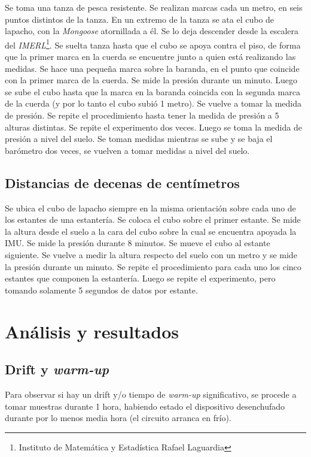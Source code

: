 \documentclass[main]{subfiles}
\begin{document}
Se toma una tanza de pesca resistente. Se realizan marcas cada un metro, en seis puntos distintos de la tanza. En un extremo de la tanza se ata el cubo de lapacho, con la \emph{Mongoose} atornillada a él. Se lo deja descender desde la escalera del \emph{IMERL}\footnote{Instituto de Matemática y Estadística Rafael Laguardia}. Se suelta tanza hasta que el cubo se apoya contra el piso, de forma que la primer marca en la cuerda se encuentre junto a quien está realizando las medidas. Se hace una pequeña marca sobre la baranda, en el punto que coincide con la primer marca de la cuerda. Se mide la presión durante un minuto. Luego se sube el cubo hasta que la marca en la baranda coincida con la segunda marca de la cuerda (y por lo tanto el cubo subió 1 metro). Se vuelve a tomar la medida de presión. Se repite el procedimiento hasta tener la medida de presión a 5 alturas distintas. 
Se repite el experimento dos veces. Luego se toma la medida de presión a nivel del suelo. Se toman medidas mientras se sube y se baja el barómetro dos veces, se vuelven a tomar medidas a nivel del suelo.

\subsection{Distancias de decenas de centímetros}

Se ubica el cubo de lapacho siempre en la misma orientación sobre cada uno de los estantes de una estantería. Se coloca el cubo sobre el primer estante. Se mide la altura desde el suelo a la cara del cubo sobre la cual se encuentra apoyada la IMU. Se mide la presión durante 8 minutos. Se mueve el cubo al estante siguiente. Se vuelve a medir la altura respecto del suelo con un metro y se mide la presión durante un minuto. Se repite el procedimiento para cada uno los cinco estantes que componen la estantería. Luego se repite el experimento, pero tomando solamente 5 segundos de datos por estante.

\section{Análisis y resultados}

\subsection{Drift y \textit{warm-up}}
\label{sec:drift-y-warm-up}

Para observar si hay un drift y/o tiempo de \textit{warm-up} significativo, se procede a tomar muestras durante 1 hora, habiendo estado el dispositivo desenchufado durante por lo menos media hora (el circuito arranca en frío).
\end{document}
